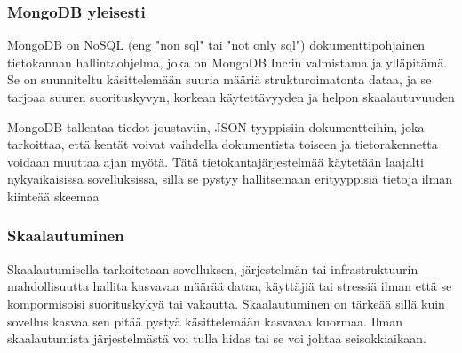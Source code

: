 







\subsubsection{MongoDB yleisesti}









MongoDB on NoSQL (eng "non sql"{} tai "not only sql"{}) dokumenttipohjainen tietokannan hallintaohjelma,
joka on MongoDB Inc:in valmistama ja ylläpitämä.
Se on suunniteltu käsittelemään suuria määriä strukturoimatonta dataa,
ja se tarjoaa suuren suorituskyvyn, korkean käytettävyyden ja helpon skaalautuvuuden
\medskip




MongoDB tallentaa tiedot joustaviin, JSON-tyyppisiin dokumentteihin, 
joka tarkoittaa, että kentät voivat vaihdella dokumentista toiseen ja tietorakennetta voidaan muuttaa ajan myötä. 
Tätä tietokantajärjestelmää käytetään laajalti nykyaikaisissa sovelluksissa, 
sillä se pystyy hallitsemaan erityyppisiä tietoja ilman kiinteää skeemaa
\medskip








\subsubsection{Skaalautuminen}




Skaalautumisella tarkoitetaan sovelluksen, järjestelmän tai infrastruktuurin
mahdollisuutta hallita kasvavaa määrää dataa, käyttäjiä tai stressiä ilman että se kompormisoisi suorituskykyä tai vakautta.
Skaalautuminen on tärkeää sillä kuin sovellus kasvaa sen pitää pystyä käsittelemään kasvavaa kuormaa.
Ilman skaalautumista järjestelmästä voi tulla hidas tai se voi johtaa seisokkiaikaan.
\medskip

